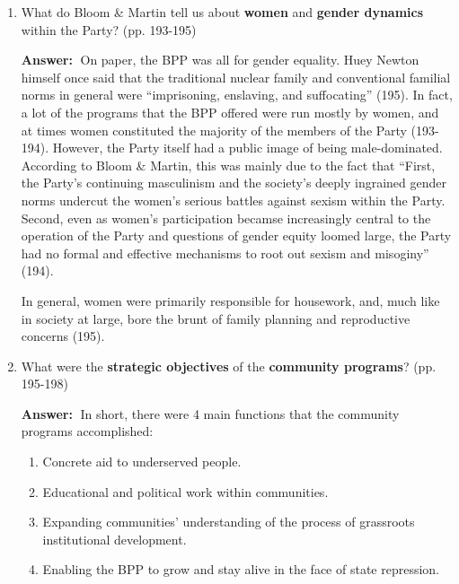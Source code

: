 \documentclass{article}
\newcommand{\answer}{\textbf{Answer:}$\;$}
\begin{document}
\begin{enumerate}[label=\arabic*)]
    \item What do Bloom \& Martin tell us about \textbf{women} and \textbf{gender dynamics} within the Party? (pp. 193-195)

    \answer
    On paper, the BPP was all for gender equality.
    Huey Newton himself once said that the traditional nuclear family and conventional familial norms in general were ``imprisoning, enslaving, and suffocating'' (195).
    In fact, a lot of the programs that the BPP offered were run mostly by women, and at times women constituted the majority of the members of the Party (193-194).
    However, the Party itself had a public image of being male-dominated.
    According to Bloom \& Martin, this was mainly due to the fact that ``First, the Party's continuing masculinism and the society's deeply ingrained gender norms undercut the women's serious battles against sexism within the Party. 
    Second, even as women's participation becamse increasingly central to the operation of the Party and questions of gender equity loomed large, the Party had no formal and effective mechanisms to root out sexism and misoginy'' (194).

    In general, women were primarily responsible for housework, and, much like in society at large, bore the brunt of family planning and reproductive concerns (195).
    
    \item What were the \textbf{strategic objectives} of the \textbf{community programs}? (pp. 195-198)
    
    \answer
    In short, there were 4 main functions that the community programs accomplished:
    \begin{enumerate}
        \item Concrete aid to underserved people.
        \item Educational and political work within communities.
        \item Expanding communities' understanding of the process of grassroots institutional development.
        \item Enabling the BPP to grow and stay alive in the face of state repression.
    \end{enumerate}
    


\end{enumerate}
\end{document}

